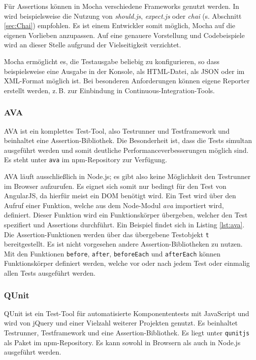 Für Assertions können in Mocha verschiedene Frameworks genutzt werden. In  \cite{mocha-index} wird beispielsweise die Nutzung von \textit{should.js}, \textit{expect.js} oder \textit{chai} (s. Abschnitt \ref{sec:Chai}) empfohlen. Es ist einem Entwickler somit möglich, Mocha auf die eigenen Vorlieben anzupassen. \cite{mocha-index} Auf eine genauere Vorstellung und Codebeispiele wird an dieser Stelle aufgrund der Vielseitigkeit verzichtet.

Mocha ermöglicht es, die Testausgabe beliebig zu konfigurieren, so dass beispielsweise eine Ausgabe in der Konsole, als HTML-Datei, als JSON oder im XML-Format möglich ist. Bei besonderen Anforderungen können eigene Reporter erstellt werden, z.\,B. zur Einbindung in Continuous-Integration-Tools.

\subsubsection{AVA}
\label{sec:Ava}
AVA ist ein komplettes Test-Tool, also Testrunner und Testframework und beinhaltet eine Assertion-Bibliothek. Die Besonderheit ist, dass die Tests simultan ausgeführt werden und somit deutliche Performanceverbesserungen möglich sind. Es steht unter \texttt{ava} im npm-Repository zur Verfügung. \cite{ava}

AVA läuft ausschließlich in Node.js; es gibt also keine Möglichkeit den Testrunner im Browser aufzurufen. Es eignet sich somit nur bedingt für den Test von AngularJS, da hierfür meist ein DOM benötigt wird. Ein Test wird über den Aufruf einer Funktion, welche aus dem Node-Modul \textit{ava} importiert wird, definiert. Dieser Funktion wird ein Funktionskörper übergeben, welcher den Test spezifiert und Assertions durchführt. Ein Beispiel findet sich in Listing \ref{lst:ava}. Die Assertion-Funktionen werden über das übergebene Testobjekt \texttt{t} bereitgestellt. Es ist nicht vorgesehen andere Assertion-Bibliotheken zu nutzen. Mit den Funktionen \texttt{before}, \texttt{after}, \texttt{beforeEach} und \texttt{afterEach} können Funktionskörper definiert werden, welche vor oder nach jedem Test oder einmalig allen Tests ausgeführt werden. \cite{ava}

\begin{figure}[H]
	
\end{figure}

\subsubsection{QUnit}
\label{sec:QUnit}
QUnit ist ein Test-Tool für automatisierte Komponententests mit JavaScript und wird von jQuery und einer Vielzahl weiterer Projekten genutzt. Es beinhaltet Testrunner, Testframework und eine Assertion-Bibliothek. Es liegt unter \texttt{qunitjs} als Paket im npm-Repository. Es kann sowohl in Browsern als auch in Node.js ausgeführt werden. \cite{qunit-index}

